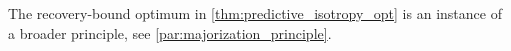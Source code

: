 

The recovery-bound optimum in \cref{thm:predictive_isotropy_opt} is an instance of a broader principle, see \cref{par:majorization_principle}.


